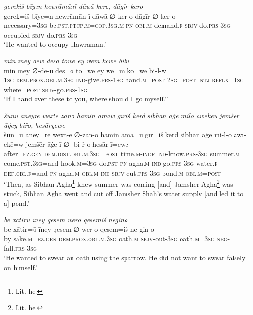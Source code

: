 \ea \label{DP.18}
\textit{gerekiš bīyen hewrāmānī dāwā kero, dāgīr kero} \\ 
\gll gerek=iš bīye=n hewrāmān-ī dāwā ∅-ker-o dāgīr ∅-ker-o \\ 
 necessary\textsc{=3sg} be\textsc{.pst}\textsc{.ptcp}\textsc{.m}\textsc{=cop}\textsc{.3sg}\textsc{.m} \textsc{pn}\textsc{-obl}\textsc{.m} demand\textsc{\textsc{.f}} \textsc{sbjv-}do\textsc{.prs}\textsc{-3sg} occupied \textsc{sbjv-}do\textsc{.prs}\textsc{-3sg} \\ 
\glt `He wanted to occupy Hawraman.'
\z 
 
\ea \label{DP.23}
\textit{min īney dew deso towe ey wēm kowe bilū} \\ 
\gll min īney ∅-de-ū des=o to=we ey wē=m ko=we bi-l-w \\ 
 \textsc{1sg} \textsc{dem.prox}\textsc{.obl}\textsc{.m}\textsc{.3sg} \textsc{ind-}give\textsc{.prs}\textsc{-1sg} hand\textsc{.m}\textsc{=\textsc{post}} \textsc{2sg}\textsc{=\textsc{post}} \textsc{intj} \textsc{reflx}\textsc{=1sg} where\textsc{=\textsc{post}} \textsc{sbjv-}go\textsc{.prs}\textsc{-1sg} \\ 
\glt `If I hand over these to you, where should I go myself?'
\z 
 
\ea \label{DP.30}
\textit{šūnū āneyre wextē zāno hāmin āmāw gīriš kerd sibhān āġe milo āwekēū jemšēr āġey biřo, hesāryewe} \\ 
\gll šūn=ū āney=re wext-ē ∅-zān-o hāmin āmā=ū gīr=iš kerd sibhān āġe mi-l-o āwī-ekē=w jemšēr āġe-ī ∅- bi-ř-o hesār-ī=ewe \\ 
 after\textsc{=ez}\textsc{.gen} \textsc{dem.dist}\textsc{.obl}\textsc{.m}\textsc{.3sg}\textsc{=\textsc{post}} time\textsc{.m}\textsc{-indf} \textsc{ind-}know\textsc{.prs}\textsc{-3sg} summer\textsc{.m} come\textsc{.pst}\textsc{.3sg}=and hook\textsc{.m}\textsc{=3sg} do\textsc{.pst} \textsc{pn} agha\textsc{.m} \textsc{ind-}go\textsc{.prs}\textsc{-3sg} water\textsc{\textsc{.f}}\textsc{-def}\textsc{.obl}\textsc{\textsc{.f}}=and \textsc{pn} agha\textsc{.m}\textsc{-obl}\textsc{.m} \textsc{ind-}\textsc{sbjv-}cut\textsc{.prs}\textsc{-3sg} pond\textsc{.m}\textsc{-obl}\textsc{.m}\textsc{=\textsc{post}} \\ 
\glt `Then, as Sibhan Agha\footnote{Lit. he.} knew summer was coming [and] Jamsher Agha\footnote{Lit. he.} was stuck, Sibhan Agha went and cut off Jamsher Shah’s water supply [and led it to a] pond.'
\z 
 
\ea \label{DP.37}
\textit{be xātirū īney qesem wero qesemiš negino} \\ 
\gll be xātir=ū īney qesem ∅-wer-o qesem=iš ne-gin-o \\ 
 by sake\textsc{.m}\textsc{=ez}\textsc{.gen} \textsc{dem.prox}\textsc{.obl}\textsc{.m}\textsc{.3sg} oath\textsc{.m} \textsc{sbjv-}out\textsc{-3sg} oath\textsc{.m}\textsc{=3sg} \textsc{neg-}fall\textsc{.prs}\textsc{-3sg} \\ 
\glt `He wanted to swear an oath using the sparrow. He did not want to swear falsely on himself.'
\z 
 
